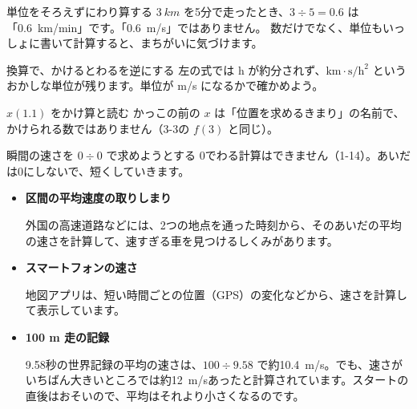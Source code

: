 \begin{tsumazuki}{単位をそろえずにわり算する}
$\qty{3}{km}$ を5分で走ったとき、$3\div5=0.6$ は「\qty{0.6}{km/min}」です。「\qty{0.6}{m/s}」ではありません。
数だけでなく、単位もいっしょに書いて計算すると、まちがいに気づけます。
\end{tsumazuki}

\begin{tsumazuki}{換算で、かけるとわるを逆にする}
左の式では h が約分されず、$\mathrm{km\cdot s/h^2}$ というおかしな単位が残ります。単位が m/s になるかで確かめよう。
\end{tsumazuki}

\begin{tsumazuki}{$x(1.1)$ をかけ算と読む}
かっこの前の $x$ は「位置を求めるきまり」の名前で、かけられる数ではありません（3-3の $f(3)$ と同じ）。
\end{tsumazuki}

\begin{tsumazuki}{瞬間の速さを $0\div0$ で求めようとする}
0でわる計算はできません（1-14）。あいだは0にしないで、短くしていきます。
\end{tsumazuki}

\begin{butsuri}
\begin{itemize}[leftmargin=1.2\zw, itemsep=2pt, topsep=0pt, label={\color{bkPurple}●}]
\item \textbf{区間の平均速度の取りしまり}\par
外国の高速道路などには、2つの地点を通った時刻から、そのあいだの平均の速さを計算して、速すぎる車を見つけるしくみがあります。
\item \textbf{スマートフォンの速さ}\par
地図アプリは、短い時間ごとの位置（GPS）の変化などから、速さを計算して表示しています。
\item \textbf{100 m 走の記録}\par
9.58秒の世界記録の平均の速さは、$100\div9.58$ で約\qty{10.4}{m/s}。でも、速さがいちばん大きいところでは約\qty{12}{m/s}あったと計算されています。スタートの直後はおそいので、平均はそれより小さくなるのです。
\end{itemize}
\end{butsuri}

